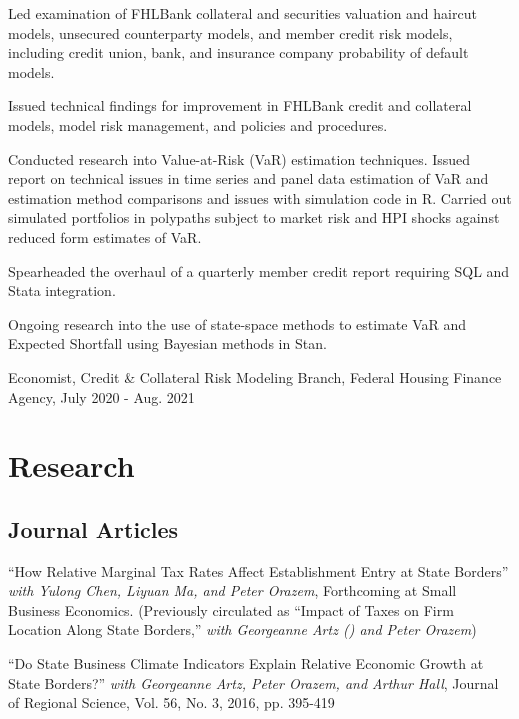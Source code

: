 \documentclass[letterpaper]{article}
\renewenvironment{itemize}{
  \begin{list}{}{
    \setlength{\leftmargin}{0em}
  }
}{
  \end{list}
}
\begin{document}
\begin{itemize}
\item Led examination of FHLBank collateral and securities valuation and haircut models, unsecured counterparty models, and member credit risk models, including credit union, bank, and insurance company probability of default models.
\item Issued technical findings for improvement in FHLBank credit and collateral models, model risk management, and policies and procedures.
\item Conducted research into Value-at-Risk (VaR) estimation techniques. Issued report on technical issues in time series and panel data estimation of VaR and estimation method comparisons and issues with simulation code in R. Carried out simulated portfolios in polypaths subject to market risk and HPI shocks against reduced form estimates of VaR.
\item Spearheaded the overhaul of a quarterly member credit report requiring SQL and Stata integration.
\item Ongoing research into the use of state-space methods to estimate VaR and Expected Shortfall using Bayesian methods in Stan.
\end{itemize}

Economist, Credit \& Collateral Risk Modeling Branch, Federal Housing Finance Agency, July 2020 - Aug. 2021


\section*{Research}

\subsection*{Journal Articles}

\begin{itemize}
\item ``How Relative Marginal Tax Rates Affect Establishment Entry at State Borders'' \textit{with Yulong Chen, Liyuan Ma, and Peter Orazem}, Forthcoming at Small Business Economics. (Previously circulated as ``Impact of Taxes on Firm Location Along State Borders,'' \textit{with Georgeanne Artz (\dag) and Peter Orazem})
\item``Do State Business Climate Indicators Explain Relative Economic Growth at State Borders?'' \textit{with Georgeanne Artz, Peter Orazem, and Arthur Hall}, Journal of Regional Science, Vol. 56, No. 3, 2016, pp. 395-419
\end{itemize}
\end{document}
